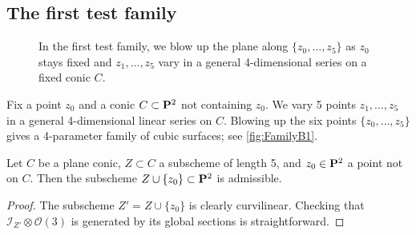 \documentclass[reqno]{amsart}
\renewcommand {\P}{{\bf P}}
\numberwithin{equation}{section}
\renewcommand{\O}{\mathcal{O}}
\begin{document}
\subsection{The first test family}
\label{sec:family-b_1}
\begin{figure}
  \centering


  \caption{In the first test family, we blow up the plane along $\{z_0, \dots, z_5\}$ as $z_0$ stays fixed and $z_1,\dots,z_5$ vary in a general 4-dimensional series on a fixed conic $C$.}
  \label{fig:FamilyB1}
\end{figure}
Fix a point $z_0$ and a conic $C \subset \P^2$ not containing $z_0$.
We vary 5 points $z_1, \dots, z_5$ in a general 4-dimensional linear series on $C$.
Blowing up the six points $\{z_0, \dots, z_5\}$ gives a 4-parameter family of cubic surfaces; see \autoref{fig:FamilyB1}.
\begin{proposition}
  \label{prop:B1}
  Let $C$ be a plane conic, $Z \subset C$ a subscheme of length 5, and $z_0 \in \P^2$ a point not on $C$.
  Then the subscheme $Z \cup \{z_0\} \subset \P^2$ is admissible.
\end{proposition}
\begin{proof}
  The subscheme $Z' = Z \cup \{z_0\}$ is clearly curvilinear.
  Checking that $\mathcal{I}_{Z'} \otimes \O(3)$ is generated by its global sections is straightforward.
\end{proof}
\end{document}
